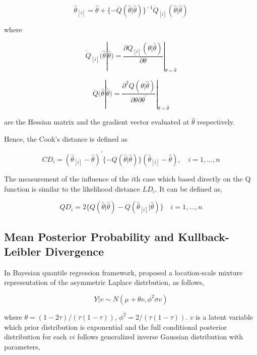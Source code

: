 \documentclass[11pt,a4paper,]{article}
\theoremstyle{definition}
\theoremstyle{definition}
\theoremstyle{remark}
\begin{document}
\begin{equation}
\hat{\theta}_{[i]}=\hat{\theta}+\{-\ddot{Q}(\hat{\theta}|\hat{\theta})\}^{-1}\dot{Q}_{[i]}(\hat{\theta}|\hat{\theta})
\label{eq: estimator}
\end{equation}

where

\[\dot{Q}_{[i]}(\hat{\theta}|\hat{\theta})=\frac{\partial Q_{[i]}(\theta|\hat{\theta})}{\partial\theta}|_{\theta=\hat{\theta}}\]

\[\ddot{Q}(\hat{\theta}|\hat{\theta})=\frac{\partial^{2}Q(\theta|\hat{\theta})}{\partial\theta\partial \theta^{'}}|_{\theta=\hat{\theta}}\]

are the Hessian matrix and the gradient vector evaluated at
\(\hat{\theta}\) respectively.

Hence, the Cook's distance is defined as

\begin{equation}
CD_{i} =(\hat{\theta}_{[i]}-\hat{\theta})^{'}\{-Q(\hat{\theta}|\hat{\theta})\}(\hat{\theta}_{[i]}-\hat{\theta}), \quad i=1,...,n
\label{eq:gd}
\end{equation}

The measurement of the influence of the \(i\)th case which based
directly on the Q function is similar to the likelihood distance
\(LD_{i}\). It can be defined as,

\begin{equation}
QD_{i}=2\{Q(\hat{\theta}|\hat{\theta})-Q(\hat{\theta}_{[i]}|\hat{\theta})\} \quad i=1,...,n
\label{eq:qd}
\end{equation}

\subsection{Mean Posterior Probability and Kullback-Leibler
Divergence}\label{mean-posterior-probability-and-kullback-leibler-divergence}

In Bayesian quantile regression framework,
\textcite{kullback1951information} proposed a location-scale mixture
representation of the asymmetric Laplace distrbution, as follows,

\begin{equation}
Y|v \sim N(\mu + \theta v, \phi^{2}\sigma v)
\label{eq:mixture}
\end{equation}

where \(\theta=(1-2\tau)/(\tau(1-\tau))\),
\(\phi^{2}=2/(\tau(1-\tau))\). \(v\) is a latent variable which prior
distribution is exponential and the full conditional posterior
distribution for each \(vi\) follows generalized inverse Gaussian
distribution with parameters,
\end{document}
